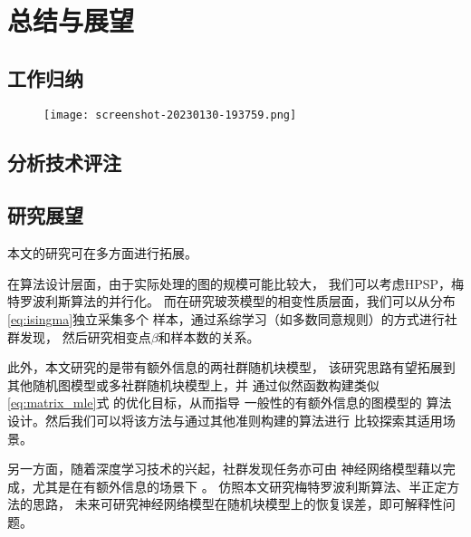 \chapter{总结与展望}
\section{工作归纳}

\begin{figure}[!ht]
    \texttt{[image: screenshot-20230130-193759.png]}
\end{figure}

\section{分析技术评注}
\section{研究展望}
本文的研究可在多方面进行拓展。

在算法设计层面，由于实际处理的图的规模可能比较大，
我们可以考虑HPSP，梅特罗波利斯算法的并行化。
而在研究玻茨模型的相变性质层面，我们可以从分布
\eqref{eq:isingma}独立采集多个
样本，通过系综学习（如多数同意规则）的方式进行社群发现，
然后研究相变点$\beta$和样本数的关系。

此外，本文研究的是带有额外信息的两社群随机块模型，
该研究思路有望拓展到其他随机图模型或多社群随机块模型上，并
通过似然函数构建类似\eqref{eq:matrix_mle}式
的优化目标，从而指导
一般性的有额外信息的图模型的
算法设计。然后我们可以将该方法与通过其他准则\cite{chunaev2020community}构建的算法进行
比较探索其适用场景。

另一方面，随着深度学习技术的兴起，社群发现任务亦可由
神经网络模型藉以完成，尤其是在有额外信息的场景下 \cite{cao2018incorporating}。
仿照本文研究梅特罗波利斯算法、半正定方法的思路，
未来可研究神经网络模型在随机块模型上的恢复误差，即可解释性问题。